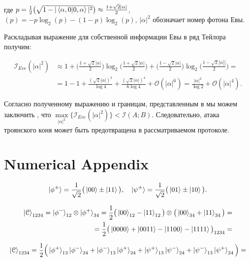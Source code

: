 \documentclass[a4paper,11pt]{article}
\begin{document}
где $p = \frac{1}{2} \big(\sqrt{1 - |\braket{\alpha, 0 | 0, \alpha}|^2 } \big) \approx \frac{1 + \sqrt2 |\alpha|}{2}$, $(p) = -p\log_2(p) - (1-p)\log_2(p)$, $|\alpha|^2$ обозначает номер фотона Евы.

Раскладывая выражение для собственной информации Евы в ряд Тейлора получим:

\begin{align*}
\mathcal{I}_{Eve}(|\alpha|^2) &\approx 1 + 
\Big( \frac{1 + \sqrt2 |\alpha|}{2} \Big) \log_2 \Big(\frac{1 + \sqrt2 |\alpha|}{2}\Big) + \Big( \frac{1 - \sqrt2 |\alpha|}{2} \Big) \log_2 \Big(\frac{1 - \sqrt2 |\alpha]|}{2}\Big) = \nonumber \\
&= 1 - 1 + \frac{(\sqrt2 |\alpha|)^2}{\log4} + \frac{(\sqrt2 |\alpha|)^4}{6\log4} + \mathcal{O}(|\alpha|^6) = \frac{|\alpha|^2}{\log2} + \mathcal{O}(|\alpha|^4).
\end{align*}

Согласно полученному выражению и границам, представленным в \cite{trojan} мы можем заключить \cite{base}, что $\max\limits_{|\alpha|^2} \big\{\mathcal{I}_{Eve} (|\alpha|^2) \big\} < \mathcal{I}(A; B)$. Следовательно, атака троянского коня может
быть предотвращена в рассматриваемом протоколе.


\section{Numerical Appendix}

\begin{equation*}
\ket{\phi^{\pm}} = \dfrac{1}{\sqrt2}\big(\ket{00} \pm \ket{11} \big), \quad
\ket{\psi^{\pm}} = \dfrac{1}{\sqrt2}\big(\ket{01} \pm \ket{10} \big).
\end{equation*}



\begin{align*}
\ket{\mathcal{C}}_{1234} = \ket{\phi^-}_{12} \otimes \ket{\phi^+}_{34}
= \dfrac{1}{2} \big(\ket{00}_{12} - \ket{11}_{12} \big) \otimes \big( \ket{00}_{34} + \ket{11}_{34} \big) = \nonumber \\
= \dfrac{1}{2} \big(\ket{0000} + \ket{0011} - \ket{1100} - \ket{1111}\big)_{1234} =
\end{align*}

\begin{align*}
\ket{\mathcal{C}}_{1234} = \dfrac{1}{2} \Big(\ket{\phi^+}_{13} \ket{\phi^-}_{24} + 
\ket{\phi^-}_{13} \ket{\phi^+}_{24} +
\ket{\psi^+}_{13} \ket{\psi^-}_{24} +
\ket{\psi^-}_{13} \ket{\psi^+}_{24} \Big) = \nonumber \\
\end{align*}
\end{document}
